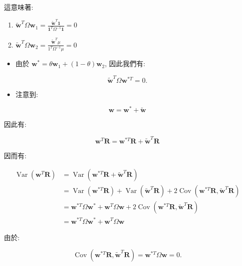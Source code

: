 \documentclass[letterpaper]{article}
\begin{document}
		這意味著: 
		
		\begin{enumerate}
			\item $\tilde{\mathbf{w}}^{T} \Omega \mathbf{w}_{1}=\frac{\tilde{\mathbf{w}}^{T} \mathbf{1}}{\mathbf{1}^{T} \Omega^{-1} \mathbf{1}}=0$
			\item $\tilde{\mathbf{w}}^{T} \Omega \mathbf{w}_{2}=\frac{\tilde{\mathbf{w}}^{T} \mu}{1^{T} \Omega^{-1} \mu}=0$
		\end{enumerate}
		
		\begin{itemize}
			\item 由於 $\mathbf{w}^{*} = \theta \mathbf{w}_{1} + (1 - \theta) \mathbf{w}_{2}$, 因此我們有: 
		\end{itemize}
		
		$$
		\tilde{\mathbf{w}}^{T} \Omega \mathbf{w}^{* T}=0 .
		$$
		
		\begin{itemize}
			\item 注意到: 
		\end{itemize}
		
		$$
		\mathbf{w}=\mathbf{w}^{*}+\tilde{\mathbf{w}}
		$$
		
		因此有: 
		
		$$
		\mathbf{w}^{T} \mathbf{R}=\mathbf{w}^{* T} \mathbf{R}+\tilde{\mathbf{w}}^{T} \mathbf{R}
		$$
		
		因而有: 
		
		$$
		\begin{aligned}
			\operatorname{Var}\left (\mathbf{w}^{T} \mathbf{R}\right) & =\operatorname{Var}\left (\mathbf{w}^{* T} \mathbf{R}+\tilde{\mathbf{w}}^{T} \mathbf{R}\right) \\
			& =\operatorname{Var}\left (\mathbf{w}^{* T} \mathbf{R}\right) +\operatorname{Var}\left (\tilde{\mathbf{w}}^{T} \mathbf{R}\right) +2 \operatorname{Cov}\left (\mathbf{w}^{* T} \mathbf{R}, \tilde{\mathbf{w}}^{T} \mathbf{R}\right) \\
			& =\mathbf{w}^{* T} \Omega \mathbf{w}^{*}+\mathbf{w}^{T} \Omega \mathbf{w}+2 \operatorname{Cov}\left (\mathbf{w}^{* T} \mathbf{R}, \tilde{\mathbf{w}}^{T} \mathbf{R}\right) \\
			& =\mathbf{w}^{* T} \Omega \mathbf{w}^{*}+\mathbf{w}^{T} \Omega \mathbf{w}
		\end{aligned}
		$$
		
		由於: 
		
		$$
		\operatorname{Cov}\left (\mathbf{w}^{* T} \mathbf{R}, \tilde{\mathbf{w}}^{T} \mathbf{R}\right) =\mathbf{w}^{* T} \Omega \mathbf{w}=0 .
		$$
		
\end{document}
